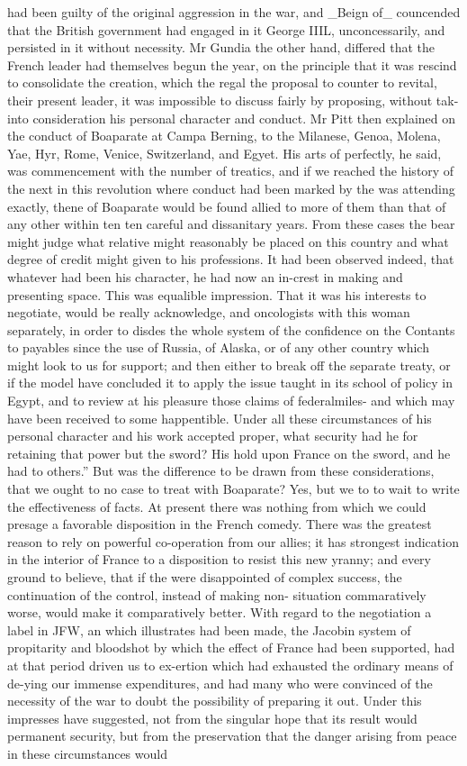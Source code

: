 \documentclass{article}
\begin{document}
had been guilty of the original aggression in the war, and \_Beign of\_ councended that the British government had engaged in it George IIIL, unconcessarily, and persisted in it without necessity. Mr Gundia the other hand, differed that the French leader had themselves begun the year, on the principle that it was rescind to consolidate the creation, which the regal the proposal to counter to revital, their present leader, it was impossible to discuss fairly by proposing, without tak- into consideration his personal character and conduct. Mr Pitt then explained on the conduct of Boaparate at Campa Berning, to the Milanese, Genoa, Molena, Yae, Hyr, Rome, Venice, Switzerland, and Egyet. His arts of perfectly, he said, was commencement with the number of treatics, and if we reached the history of the next in this revolution where conduct had been marked by the was attending exactly, thene of Boaparate would be found allied to more of them than that of any other within ten ten careful and dissanitary years. From these cases the bear might judge what relative might reasonably be placed on this country and what degree of credit might given to his professions. It had been observed indeed, that whatever had been his character, he had now an in-crest in making and presenting space. This was equalible impression. That it was his interests to negotiate, would be really acknowledge, and oncologists with this woman separately, in order to disdes the whole system of the confidence on the Contants to payables since the use of Russia, of Alaska, or of any other country which might look to us for support; and then either to break off the separate treaty, or if the model have concluded it to apply the issue taught in its school of policy in Egypt, and to review at his pleasure those claims of federalmiles- and which may have been received to some happentible. Under all these circumstances of his personal character and his work accepted proper, what security had he for retaining that power but the sword? His hold upon France on the sword, and he had to others.” But was the difference to be drawn from these considerations, that we ought to no case to treat with Boaparate? Yes, but we to to wait to write the effectiveness of facts. At present there was nothing from which we could presage a favorable disposition in the French comedy. There was the greatest reason to rely on powerful co-operation from our allies; it has strongest indication in the interior of France to a disposition to resist this new yranny; and every ground to believe, that if the were disappointed of complex success, the continuation of the control, instead of making non- situation commaratively worse, would make it comparatively better. With regard to the negotiation a label in JFW, an which illustrates had been made, the Jacobin system of propitarity and bloodshot by which the effect of France had been supported, had at that period driven us to ex-ertion which had exhausted the ordinary means of de-ying our immense expenditures, and had many who were convinced of the necessity of the war to doubt the possibility of preparing it out. Under this impresses have suggested, not from the singular hope that its result would permanent security, but from the preservation that the danger arising from peace in these circumstances would 
\end{document}

